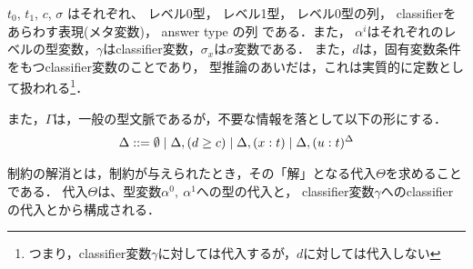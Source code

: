 $t_0$, $t_1$, $c$, $\sigma$ はそれぞれ、
レベル0型，
レベル1型，
レベル0型の列，
classifierをあらわす表現(メタ変数)，
answer type の列
である．また，
$\alpha^i$はそれぞれのレベルの型変数，$\gamma$はclassifier変数，$\sigma_x$は$\sigma$変数である．
また，$d$は，固有変数条件をもつclassifier変数のことであり，
型推論のあいだは，これは実質的に定数として扱われる\footnote{つまり，classifier変数$\gamma$に対しては代入するが，$d$に対しては代入しない}．

また，$\Gamma$は，一般の型文脈であるが，不要な情報を落として以下の形にする．
\begin{align*}
  \Delta ::= \emptyset
  \mid \Delta, ({d} \ge {c})
  \mid \Delta, (x : t)
  \mid \Delta, (u : t)^{\Delta}
\end{align*}


制約の解消とは，制約が与えられたとき，その「解」となる代入$\Theta$を求めることである．
代入$\Theta$は、型変数$\alpha^0,~ \alpha^1$への型の代入と，
classifier変数$\gamma$へのclassifierの代入とから構成される．



